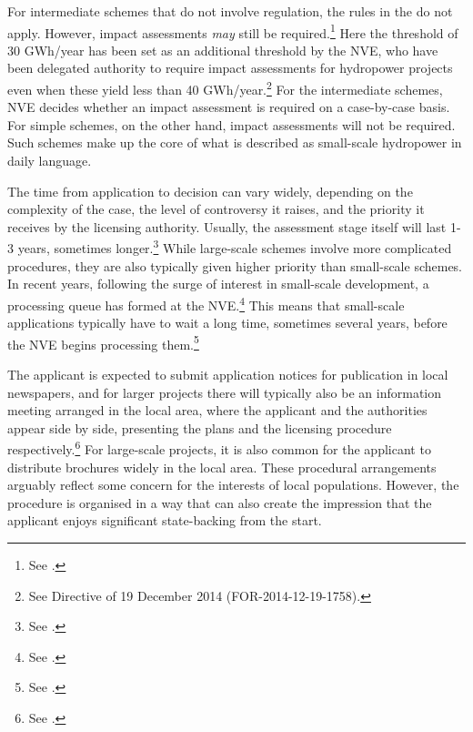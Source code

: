 For intermediate schemes that do not involve regulation, the rules in the \cite{wra17} do not apply. However, impact assessments {\it may} still be required.\footnote{See \cite[20]{stokker10}.} Here the threshold of 30 GWh/year has been set as an additional threshold by the NVE, who have been delegated authority to require impact assessments for hydropower projects even when these yield less than 40 GWh/year.\footnote{See Directive of 19 December 2014 (FOR-2014-12-19-1758).} For the intermediate schemes, NVE decides whether an impact assessment is required on a case-by-case basis. For simple schemes, on the other hand, impact assessments will not be required. Such schemes make up the core of what is described as small-scale hydropower in daily language.

The time from application to decision can vary widely, depending on the complexity of the case, the level of controversy it raises, and the priority it receives by the licensing authority. Usually, the assessment stage itself will last 1-3 years, sometimes longer.\footnote{See \cite[84-85]{nou129}.} While large-scale schemes involve more complicated procedures, they are also typically given higher priority than small-scale schemes. In recent years, following the surge of interest in small-scale development, a processing queue has formed at the NVE.\footnote{See \cite[84]{nou129}.} This means that small-scale applications typically have to wait a long time, sometimes several years, before the NVE begins processing them.\footnote{See \cite[84]{nou129}.}


The applicant is expected to submit application notices for publication in local newspapers, and for larger projects there will typically also be an information meeting arranged in the local area, where the applicant and the authorities appear side by side, presenting the plans and the licensing procedure respectively.\footnote{See \cite[23]{stokker10}.} For large-scale projects, it is also common for the applicant to distribute brochures widely in the local area. These procedural arrangements arguably reflect some concern for the interests of local populations. However, the procedure is organised in a way that can also create the impression that the applicant enjoys significant state-backing from the start.

